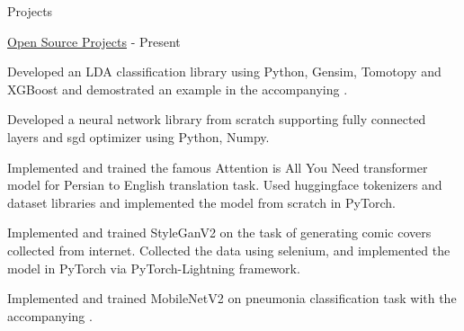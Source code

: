 \documentclass[../professional-cv.tex]{subfiles}
\begin{document}
	\begin{rSection}{Projects}
		
		\begin{rProjectSection}
			{\href{https://github.com/FeryET}{Open Source Projects}}
			{  - Present }
			{}{}			
			\item \href{https://github.com/FeryET/lda_classification}{\faGithub} Developed an LDA classification library using Python, Gensim, Tomotopy and XGBoost and demostrated an example in the accompanying .
			\item \href{https://github.com/FeryET/scratch_nn_lib}{\faGithub} Developed a neural network library from scratch supporting fully connected layers and sgd optimizer using Python, Numpy.
			\item \href{https://github.com/FeryET/persian-to-english-transformer}{\faGithub} Implemented and trained the famous Attention is All You Need transformer model for Persian to English translation task. Used huggingface tokenizers and dataset libraries and implemented the model from scratch in PyTorch.
			\item \href{https://github.com/FeryET/comic-cover-generator}{\faGithub} Implemented and trained StyleGanV2 on the task of generating comic covers collected from internet. Collected the data using selenium, and implemented the model in PyTorch via PyTorch-Lightning framework.
			\item \href{https://github.com/FeryET/pneumonia_analysis}{\faGithub} Implemented and trained MobileNetV2 on pneumonia classification task with the accompanying .
			
			
			
		\end{rProjectSection}
		
		
	\end{rSection}
\end{document}
